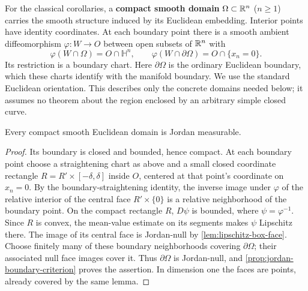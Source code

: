 For the classical corollaries, a \textbf{compact smooth domain}
$\Omega\subset\mathbb{R}^n$ ($n\geq1$) carries the smooth structure induced by
its Euclidean embedding. Interior points have identity coordinates.
At each boundary point there is a smooth ambient diffeomorphism
$\varphi:W\to O$ between open subsets of $\mathbb{R}^n$ with
\[
\varphi(W\cap\Omega)=O\cap\mathbb H^n,
\qquad
\varphi(W\cap\partial\Omega)=O\cap\{x_n=0\}.
\]
Its restriction is a boundary chart. Here $\partial\Omega$ is the
ordinary Euclidean boundary, which these charts identify with the manifold
boundary. We use the standard Euclidean orientation. This describes only
the concrete domains needed below; it assumes no theorem about the region
enclosed by an arbitrary simple closed curve.

\begin{proposition}
\label{prop:smooth-domain-jordan}
Every compact smooth Euclidean domain is Jordan measurable.
\end{proposition}
\begin{proof}
Its boundary is closed and bounded, hence compact. At each boundary point
choose a straightening chart as above and a small closed coordinate
rectangle $R=R'\times[-\delta,\delta]$ inside $O$, centered at that
point's coordinate on $x_n=0$. By the boundary-straightening identity,
the inverse image under $\varphi$ of the relative interior of the central
face $R'\times\{0\}$ is a relative neighborhood of the boundary point.
On the compact rectangle $R$, $D\psi$ is bounded, where
$\psi=\varphi^{-1}$. Since $R$ is convex, the mean-value estimate on
its segments makes $\psi$ Lipschitz there. The image of its central face is Jordan-null
by \cref{lem:lipschitz-box-face}. Choose finitely many of these boundary
neighborhoods covering $\partial\Omega$; their associated null face images
cover it. Thus $\partial\Omega$ is Jordan-null, and
\cref{prop:jordan-boundary-criterion} proves the assertion. In dimension
one the faces are points, already covered by the same lemma.
\end{proof}

